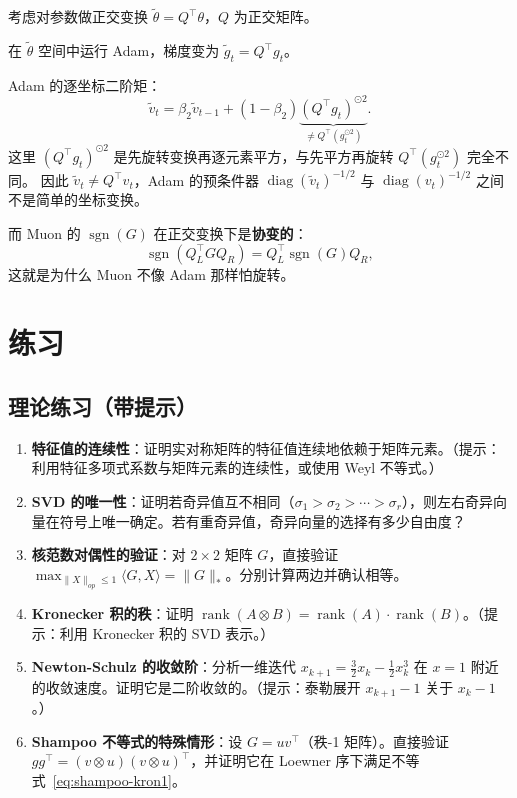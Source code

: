 \documentclass[12pt,a4paper]{ctexart}
\theoremstyle{definition}
\theoremstyle{plain}
\newcommand{\diag}{\operatorname{diag}}
\DeclareMathOperator{\sgn}{sgn}
\DeclareMathOperator{\rank}{rank}
\begin{document}
考虑对参数做正交变换 $\tilde\theta = Q^\top\theta$，$Q$ 为正交矩阵。

在 $\tilde\theta$ 空间中运行 Adam，梯度变为 $\tilde g_t = Q^\top g_t$。

Adam 的逐坐标二阶矩：
\[
  \tilde v_t = \beta_2\tilde v_{t-1} + (1-\beta_2)\underbrace{(Q^\top g_t)^{\odot2}}_{\neq Q^\top(g_t^{\odot2})}.
\]
这里 $(Q^\top g_t)^{\odot2}$ 是先旋转变换再逐元素平方，与先平方再旋转 $Q^\top(g_t^{\odot2})$ 完全不同。
因此 $\tilde v_t \neq Q^\top v_t$，Adam 的预条件器 $\diag(\tilde v_t)^{-1/2}$ 与 $\diag(v_t)^{-1/2}$ 之间不是简单的坐标变换。

而 Muon 的 $\sgn(G)$ 在正交变换下是\textbf{协变的}：
\[
  \sgn(Q_L^\top G Q_R) = Q_L^\top \sgn(G) Q_R,
\]
这就是为什么 Muon 不像 Adam 那样怕旋转。

\section{练习}

\subsection*{理论练习（带提示）}

\begin{enumerate}
  \item \textbf{特征值的连续性}：证明实对称矩阵的特征值连续地依赖于矩阵元素。（提示：利用特征多项式系数与矩阵元素的连续性，或使用 Weyl 不等式。）

  \item \textbf{SVD 的唯一性}：证明若奇异值互不相同（$\sigma_1>\sigma_2>\cdots>\sigma_r$），则左右奇异向量在符号上唯一确定。若有重奇异值，奇异向量的选择有多少自由度？

  \item \textbf{核范数对偶性的验证}：对 $2\times2$ 矩阵 $G$，直接验证 $\max_{\|X\|_{op}\le1}\langle G,X\rangle = \|G\|_*$。分别计算两边并确认相等。

  \item \textbf{Kronecker 积的秩}：证明 $\rank(A\otimes B) = \rank(A)\cdot\rank(B)$。（提示：利用 Kronecker 积的 SVD 表示。）

  \item \textbf{Newton-Schulz 的收敛阶}：分析一维迭代 $x_{k+1}=\frac32x_k-\frac12x_k^3$ 在 $x=1$ 附近的收敛速度。证明它是二阶收敛的。（提示：泰勒展开 $x_{k+1}-1$ 关于 $x_k-1$。）

  \item \textbf{Shampoo 不等式的特殊情形}：设 $G=uv^\top$（秩-1 矩阵）。直接验证 $gg^\top = (v\otimes u)(v\otimes u)^\top$，并证明它在 Loewner 序下满足不等式~\eqref{eq:shampoo-kron1}。
\end{enumerate}
\end{document}
